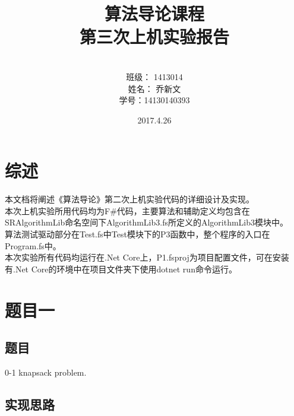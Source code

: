 \documentclass[a4paper]{article}
\begin{document}
\title{\Huge 算法导论课程\\ 第三次上机实验报告}
\author { \vspace{12cm} \\ \LARGE 班级：  1413014  \\ \LARGE 姓名：  乔新文   \\ \LARGE 学号：14130140393} 
\date{ \vspace{4cm} 2017.4.26}

\maketitle
\clearpage

\tableofcontents

\clearpage

\section{综述}

本文档将阐述《算法导论》第二次上机实验代码的详细设计及实现。\\

本次上机实验所用代码均为F\#代码，主要算法和辅助定义均包含在SRAlgorithmLib命名空间下AlgorithmLib3.fs所定义的AlgorithmLib3模块中。\\

算法测试驱动部分在Test.fs中Test模块下的P3函数中，整个程序的入口在Program.fs中。\\

本次实验所有代码均运行在.Net Core上，P1.fsproj为项目配置文件，可在安装有.Net Core的环境中在项目文件夹下使用dotnet run命令运行。\\

\section{题目一}

\subsection{题目}

0-1 knapsack problem.

\subsection{实现思路}
\end{document}
